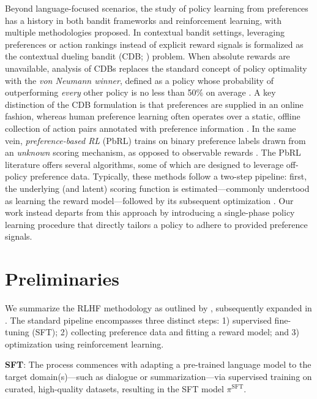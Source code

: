 Beyond language-focused scenarios, the study of policy learning from preferences has a history in both bandit frameworks and reinforcement learning, with multiple methodologies proposed. In contextual bandit settings, leveraging preferences or action rankings instead of explicit reward signals is formalized as the contextual dueling bandit (CDB; \cite{yue2012karmed,dudik2015contextual}) problem. When absolute rewards are unavailable, analysis of CDBs replaces the standard concept of policy optimality with the \textit{von Neumann winner}, defined as a policy whose probability of outperforming \textit{every} other policy is no less than 50\% on average \citep{dudik2015contextual}. A key distinction of the CDB formulation is that preferences are supplied in an online fashion, whereas human preference learning often operates over a static, offline collection of action pairs annotated with preference information \citep{yan2022human}. In the same vein, \textit{preference-based RL} (PbRL) trains on binary preference labels drawn from an \textit{unknown} scoring mechanism, as opposed to observable rewards \citep{BusaFekete2014,ruiz2023dueling}. The PbRL literature offers several algorithms, some of which are designed to leverage off-policy preference data. Typically, these methods follow a two-step pipeline: first, the underlying (and latent) scoring function is estimated—commonly understood as learning the reward model—followed by its subsequent optimization \citep{jain2013learning,BusaFekete2014,christiano2017deep,sadigh2017active,kupcsik2018learning}. Our work instead departs from this approach by introducing a single-phase policy learning procedure that directly tailors a policy to adhere to provided preference signals.

\section{Preliminaries}\label{section:prelims}

We summarize the RLHF methodology as outlined by \citeauthor{ziegler2020finetuning}, subsequently expanded in \citep{stiennon2022learning, bai2022training, ouyang2022training}. The standard pipeline encompasses three distinct steps: 1) supervised fine-tuning (SFT); 2) collecting preference data and fitting a reward model; and 3) optimization using reinforcement learning.

\textbf{SFT}: The process commences with adapting a pre-trained language model to the target domain(s)—such as dialogue or summarization—via supervised training on curated, high-quality datasets, resulting in the SFT model $\pi^\text{SFT}$.

